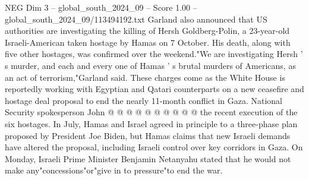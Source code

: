 \begin{textsample}{NEG Dim 3 – global\_south\_2024\_09 – Score 1.00 – global\_south\_2024\_09/113494192.txt}
Garland also announced that US authorities are investigating the killing of Hersh Goldberg-Polin, a 23-year-old Israeli-American taken hostage by Hamas on 7 October.
His death, along with five other hostages, was confirmed over the weekend."We are investigating Hersh ' s murder, and each and every one of Hamas ' s brutal murders of Americans, as an act of terrorism,"Garland said.
These charges come as the White House is reportedly working with Egyptian and Qatari counterparts on a new ceasefire and hostage deal proposal to end the nearly 11-month conflict in Gaza.
National Security spokesperson John @ @ @ @ @ @ @ @ @ @ the recent execution of the six hostages.
In July, Hamas and Israel agreed in principle to a three-phase plan proposed by President Joe Biden, but Hamas claims that new Israeli demands have altered the proposal, including Israeli control over key corridors in Gaza.
On Monday, Israeli Prime Minister Benjamin Netanyahu stated that he would not make any"concessions"or"give in to pressure"to end the war.

\end{textsample}
